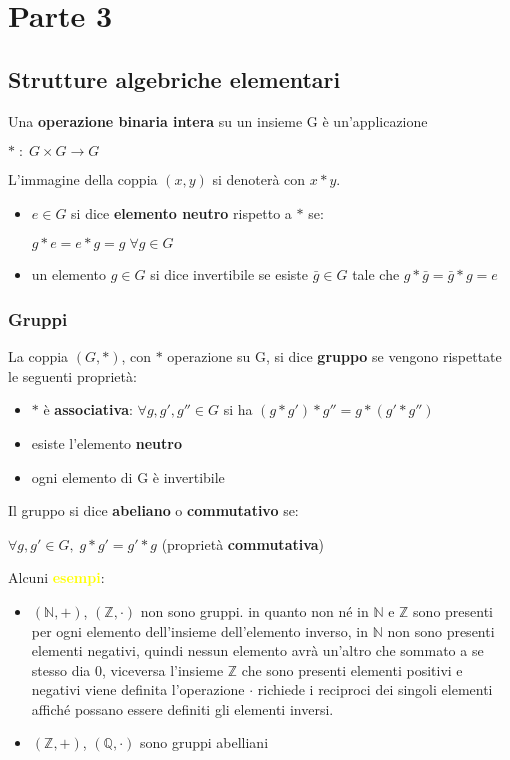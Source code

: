 \chapter{Parte 3}
\section{Strutture algebriche elementari}
Una \textbf{operazione binaria intera} su un insieme G è un'applicazione 
\begin{center}
    $\ast \; : \; G \times G \rightarrow G$
\end{center}
L'immagine della coppia $(x,y)$ si denoterà con $x \ast y$. 
\begin{itemize}[nosep]
    \item $e \in G$ si dice \textbf{elemento neutro} rispetto a $\ast$ se:
    \begin{center}
        $g \ast e = e \ast g = g \; \forall g \in G$
    \end{center}
    \item un elemento $g \in G$ si dice invertibile se esiste $\bar{g} \in G$ tale che $g * \bar{g} = \bar{g} * g = e$
\end{itemize}

\subsection{Gruppi}
La coppia $(G, \ast)$, con $\ast$ operazione su G, si dice \textbf{gruppo} se vengono rispettate le seguenti proprietà:
\begin{itemize}[nosep]
    \item $\ast$ è \textbf{associativa}: $\forall g, g', g'' \in G$ si ha $(g \ast g') \ast g'' = g \ast (g' \ast g'')$
    \item esiste l'elemento \textbf{neutro}
    \item ogni elemento di G è invertibile
\end{itemize}
Il gruppo si dice \textbf{abeliano} o \textbf{commutativo} se: 
\begin{center}
    $\forall g, g' \in G, \; g \ast g' = g' \ast g$ (proprietà \textbf{commutativa})
\end{center}
Alcuni \textcolor{yellow}{\textbf{esempi}}:
\begin{itemize}[nosep]
    \item $(\mathbb{N}, +)$, $(\mathbb{Z}, \cdot)$ non sono gruppi. in quanto non né in $\mathbb{N}$ e $\mathbb{Z}$ sono presenti per ogni elemento dell'insieme dell'elemento inverso, in $\mathbb{N}$ non sono presenti elementi negativi, quindi nessun elemento avrà un'altro che sommato a se stesso dia 0, viceversa l'insieme $\mathbb{Z}$ che sono presenti elementi positivi e negativi viene definita l'operazione $\cdot$ richiede i reciproci dei singoli elementi affiché possano essere definiti gli elementi inversi.
    \item $(\mathbb{Z}, +)$, $(\mathbb{Q}, \cdot)$ sono gruppi abelliani
\end{itemize}


